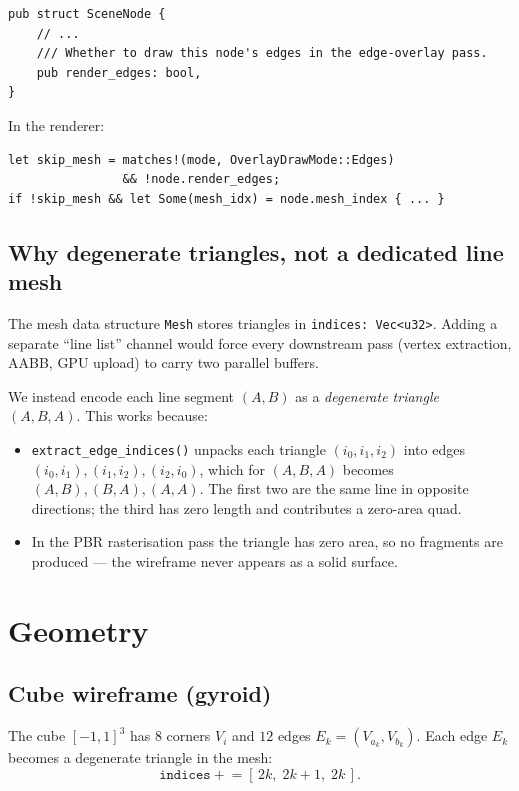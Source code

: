 \documentclass[11pt]{article}
\begin{document}
\begin{lstlisting}
pub struct SceneNode {
    // ...
    /// Whether to draw this node's edges in the edge-overlay pass.
    pub render_edges: bool,
}
\end{lstlisting}

In the renderer:

\begin{lstlisting}
let skip_mesh = matches!(mode, OverlayDrawMode::Edges)
                && !node.render_edges;
if !skip_mesh && let Some(mesh_idx) = node.mesh_index { ... }
\end{lstlisting}

\subsection{Why degenerate triangles, not a dedicated line mesh}

The mesh data structure \texttt{Mesh} stores triangles in
\texttt{indices: Vec<u32>}.  Adding a separate ``line list'' channel
would force every downstream pass (vertex extraction, AABB, GPU upload)
to carry two parallel buffers.

We instead encode each line segment $(A,B)$ as a \emph{degenerate
triangle} $(A, B, A)$.  This works because:
\begin{itemize}
  \item \texttt{extract\_edge\_indices()} unpacks each triangle
        $(i_0,i_1,i_2)$ into edges $(i_0,i_1), (i_1,i_2), (i_2,i_0)$,
        which for $(A,B,A)$ becomes $(A,B), (B,A), (A,A)$.  The first
        two are the same line in opposite directions; the third has
        zero length and contributes a zero-area quad.
  \item In the PBR rasterisation pass the triangle has zero area, so
        no fragments are produced --- the wireframe never appears as
        a solid surface.
\end{itemize}

\section{Geometry}

\subsection{Cube wireframe (gyroid)}

The cube $[-1,1]^3$ has $8$ corners $V_i$ and $12$ edges
$E_k = (V_{a_k}, V_{b_k})$.  Each edge $E_k$ becomes a degenerate
triangle in the mesh:
\[
  \texttt{indices} \mathrel{+}= [\, 2k,\; 2k+1,\; 2k\,].
\]
\end{document}

